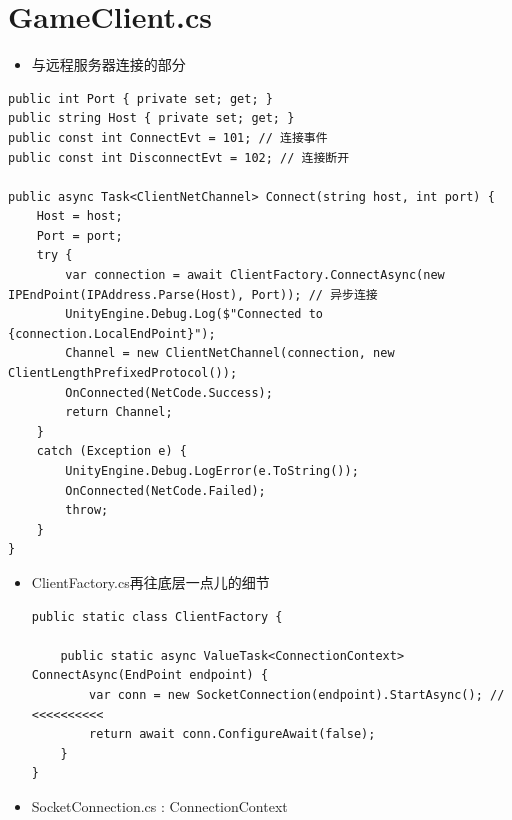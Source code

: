 \documentclass[9pt, b5paper]{article}
\begin{document}
\section{GameClient.cs}
\label{sec-7}
\begin{itemize}
\item 与远程服务器连接的部分
\end{itemize}
\begin{verbatim}
public int Port { private set; get; }
public string Host { private set; get; }
public const int ConnectEvt = 101; // 连接事件
public const int DisconnectEvt = 102; // 连接断开

public async Task<ClientNetChannel> Connect(string host, int port) {
    Host = host;
    Port = port;
    try {
        var connection = await ClientFactory.ConnectAsync(new IPEndPoint(IPAddress.Parse(Host), Port)); // 异步连接
        UnityEngine.Debug.Log($"Connected to {connection.LocalEndPoint}");
        Channel = new ClientNetChannel(connection, new ClientLengthPrefixedProtocol());
        OnConnected(NetCode.Success);
        return Channel;
    }
    catch (Exception e) {
        UnityEngine.Debug.LogError(e.ToString());
        OnConnected(NetCode.Failed);
        throw;
    }
}
\end{verbatim}
\begin{itemize}
\item ClientFactory.cs再往底层一点儿的细节
\begin{verbatim}
public static class ClientFactory {

    public static async ValueTask<ConnectionContext> ConnectAsync(EndPoint endpoint) {
        var conn = new SocketConnection(endpoint).StartAsync(); // <<<<<<<<<< 
        return await conn.ConfigureAwait(false);
    }
}
\end{verbatim}
\item SocketConnection.cs : ConnectionContext
\end{itemize}
\end{document}
